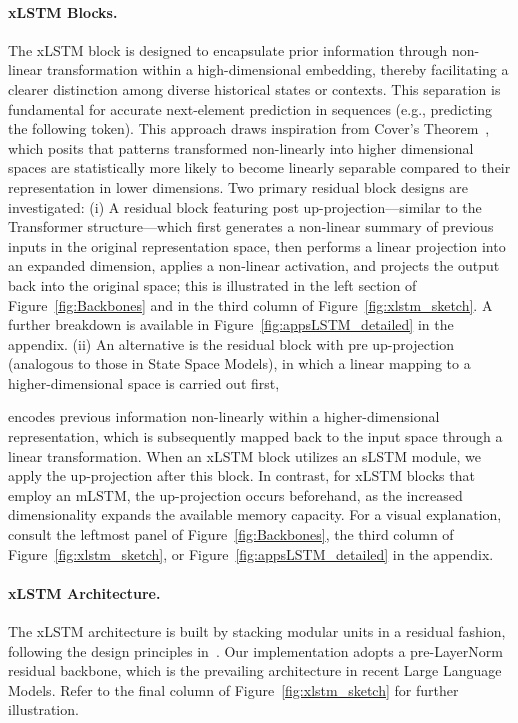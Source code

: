 \paragraph{xLSTM Blocks.}
\label{sec:xLSTMblock}
The xLSTM block is designed to encapsulate prior information through non-linear transformation within a high-dimensional embedding, thereby facilitating a clearer distinction among diverse historical states or contexts. This separation is fundamental for accurate next-element prediction in sequences (e.g., predicting the following token). This approach draws inspiration from Cover’s Theorem~\citep{Cover:65}, which posits that patterns transformed non-linearly into higher dimensional spaces are statistically more likely to become linearly separable compared to their representation in lower dimensions. Two primary residual block designs are investigated: (i) A residual block featuring post up-projection—similar to the Transformer structure—which first generates a non-linear summary of previous inputs in the original representation space, then performs a linear projection into an expanded dimension, applies a non-linear activation, and projects the output back into the original space; this is illustrated in the left section of Figure~\ref{fig:Backbones}
and in the third column of Figure~\ref{fig:xlstm_sketch}. A further breakdown is available in Figure~\ref{fig:appsLSTM_detailed} in the appendix. (ii) An alternative is the residual block with pre up-projection (analogous to those in State Space Models), in which a linear mapping to a higher-dimensional space is carried out first,

encodes previous information non-linearly within a higher-dimensional representation, which is subsequently mapped back to the input space through a linear transformation. When an xLSTM block utilizes an sLSTM module, we apply the up-projection after this block. In contrast, for xLSTM blocks that employ an mLSTM, the up-projection occurs beforehand, as the increased dimensionality expands the available memory capacity. For a visual explanation, consult the leftmost panel of Figure~\ref{fig:Backbones}, the third column of Figure~\ref{fig:xlstm_sketch}, or Figure~\ref{fig:appsLSTM_detailed} in the appendix.

\paragraph{xLSTM Architecture.}
\label{sec:xLSTMarchitecure}
The xLSTM architecture is built by stacking modular units in a residual fashion, following the design principles in~\citep{Srivastava:15,He:16}. Our implementation adopts a pre-LayerNorm~\citep{Ba:16b} residual backbone, which is the prevailing architecture in recent Large Language Models. Refer to the final column of Figure~\ref{fig:xlstm_sketch} for further illustration.


